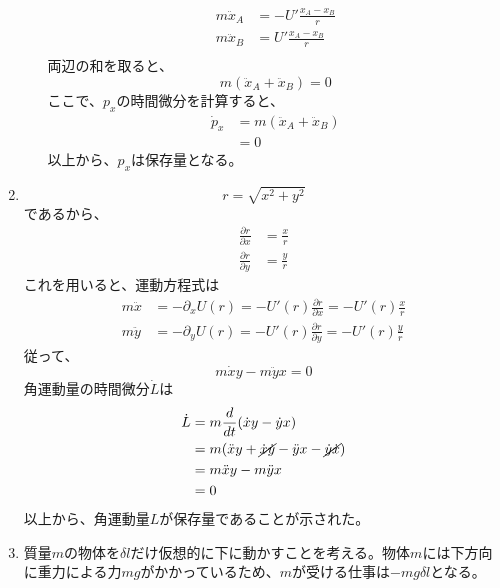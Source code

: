 \documentclass{jsarticle}
\begin{document}
\begin{enumerate}
\begin{enumerate}
                $$
                  \begin{aligned}
                    m\ddot{x}_A & = -U' \frac{x_A - x_B}{r} \\
                    m\ddot{x}_B & = U' \frac{x_A - x_B}{r}  \\
                  \end{aligned}
                $$
                両辺の和を取ると、
                $$
                  m (\ddot{x}_A + \ddot{x}_B) = 0
                $$
                ここで、$p_x$の時間微分を計算すると、
                $$
                  \begin{aligned}
                    \dot{p}_x & = m (\ddot{x}_A+\ddot{x}_B) \\
                              & = 0
                  \end{aligned}
                $$
                以上から、$p_x$は保存量となる。
        \end{enumerate}
  \item
        $$
          r = \sqrt{x^2+y^2}
        $$
        であるから、
        $$
          \begin{aligned}
            \frac{\partial r}{\partial x} & = \frac{x}{r} \\
            \frac{\partial r}{\partial y} & = \frac{y}{r}
          \end{aligned}
        $$
        これを用いると、運動方程式は
        $$
          \begin{aligned}
            m \ddot{x} & = - \partial_x U(r) = -U'(r) \frac{\partial r}{\partial x}= - U'(r) \frac{x}{r} \\
            m \ddot{y} & = - \partial_y U(r) = -U'(r) \frac{\partial r}{\partial y}= - U'(r) \frac{y}{r}
          \end{aligned}
        $$
        従って、
        $$
          m \dot{x} y - m\ddot{y} x = 0
        $$
        角運動量の時間微分$\dot{L}$は
        $$
          \begin{aligned}
            \dot{L} & = m \frac{d}{dt} (\dot{x} y - \dot{y} x)                                         \\
                    & = m (\ddot{x} y + \cancel{\dot{x}\dot{y}} - \ddot{y}x - \cancel{\dot{y}\dot{x}}) \\
                    & = m \ddot{x} y - m \ddot{y} x                                                    \\
                    & =0
          \end{aligned}
        $$
        以上から、角運動量$L$が保存量であることが示された。
  \item 質量$m$の物体を$\delta l$だけ仮想的に下に動かすことを考える。物体$m$には下方向に重力による力$mg$がかかっているため、$m$が受ける仕事は$-mg \delta l$となる。


\end{enumerate}
\end{document}
